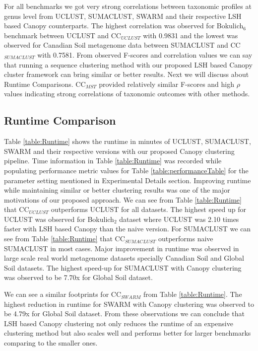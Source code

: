\documentclass[10pt, conference, compsocconf]{IEEEtran}
\begin{document}
For all benchmarks we got very strong correlations between taxonomic profiles at genus level from UCLUST, SUMACLUST, SWARM and their respective LSH based Canopy counterparts. The highest correlation was observed for Bokulich$_6$ benchmark between UCLUST and CC$_{UCLUST}$ with 0.9831 and the lowest was observed for Canadian Soil metagenome data between SUMACLUST and CC$_{SUMACLUST}$ with 0.7581. From observed F-scores and correlation values we can say that running a sequence clustering method with our proposed LSH based Canopy cluster framework can bring similar or better results. Next we will discuss about Runtime Comparisons. CC$_{MST}$ provided relatively similar F-scores and high $\rho$ values indicating strong correlations of taxonomic outcomes with other methods. 

\subsection{\textbf{Runtime Comparison}} Table \ref{table:Runtime} shows the runtime in minutes of UCLUST, SUMACLUST, SWARM and their respective versions with our proposed Canopy clustering pipeline. Time information in Table \ref{table:Runtime} was recorded while populating performance metric values for Table \ref{table:performanceTable} for the parameter setting mentioned in Experimental Details section. Improving runtime while maintaining similar or better clustering results was one of the major motivations of our proposed approach. We can see from Table \ref{table:Runtime} that CC$_{UCLUST}$ outperforms UCLUST for all datasets. The highest speed up for UCLUST was observed for Bokulich$_2$ dataset where UCLUST was 2.10 times faster with LSH based Canopy than the naive version. For SUMACLUST we can see from Table \ref{table:Runtime} that CC$_{SUMACLUST}$ outperforms naive SUMACLUST in most cases. Major improvement in runtime was observed in large scale real world metagenome datasets specially Canadian Soil and Global Soil datasets. The highest speed-up for SUMACLUST with Canopy clustering was observed to be 7.70x for Global Soil dataset.

We can see a similar footprints for CC$_{SWARM}$ from Table \ref{table:Runtime}. The highest reduction in runtime for SWARM with Canopy clustering was observed to be 4.79x for Global Soil dataset. From these observations we can conclude that LSH based Canopy clustering not only reduces the runtime of an expensive clustering method but also scales well and performs better for larger benchmarks comparing to the smaller ones.   
\end{document}
